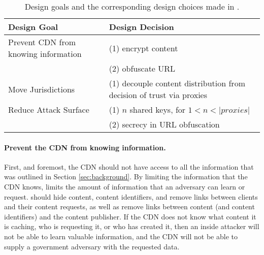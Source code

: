 \begin{table*}[h]
\centering
\begin{tabular}{| l | l |} 
 \hline
 {\bf Design Goal} & {\bf Design Decision} \\ 
 \hline\hline
 Prevent CDN from knowing information & (1) encrypt content   \\ 
                                        & (2) obfuscate URL \\ \hline
 Move Jurisdictions & (1) decouple content distribution from decision of trust via proxies  \\ \hline
 Reduce Attack Surface & (1) $n$ shared keys, for $1 < n < |proxies|$ \\ 
                        & (2) secrecy in URL obfuscation \\ 
 \hline
\end{tabular}
\caption{Design goals and the corresponding design choices made in \system{}.}
\label{tab:design_goals}
\end{table*}

\paragraph{Prevent the CDN from knowing information.} First, and foremost, the CDN 
should not have access to all the information that was outlined 
in Section \ref{sec:background}.  By limiting the information that the CDN knows, \system{} limits 
the amount of information that an adversary can learn or request.  \system{} should hide 
content, content identifiers, and remove links between clients and their content requests, as well 
as remove links between content (and content identifiers) and the content publisher.  If the CDN 
does not know what content it is caching, who is requesting it, or who has created it, then an 
inside attacker will not be able to learn valuable information, and the CDN will not be able to supply 
a government adversary with the requested data.

